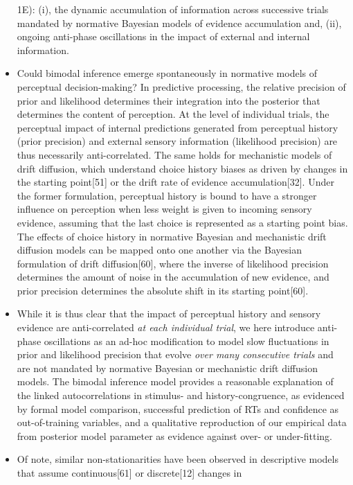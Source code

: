 \documentclass[
]{article}
\begin{document}
\begin{itemize}
  1E): (i), the dynamic accumulation of information across successive
  trials mandated by normative Bayesian models of evidence accumulation
  and, (ii), ongoing anti-phase oscillations in the impact of external
  and internal information.
\item
  Could bimodal inference emerge spontaneously in normative models of
  perceptual decision-making? In predictive processing, the relative
  precision of prior and likelihood determines their integration into
  the posterior that determines the content of perception. At the level
  of individual trials, the perceptual impact of internal predictions
  generated from perceptual history (prior precision) and external
  sensory information (likelihood precision) are thus necessarily
  anti-correlated. The same holds for mechanistic models of drift
  diffusion, which understand choice history biases as driven by changes
  in the starting point{[}51{]} or the drift rate of evidence
  accumulation{[}32{]}. Under the former formulation, perceptual history
  is bound to have a stronger influence on perception when less weight
  is given to incoming sensory evidence, assuming that the last choice
  is represented as a starting point bias. The effects of choice history
  in normative Bayesian and mechanistic drift diffusion models can be
  mapped onto one another via the Bayesian formulation of drift
  diffusion{[}60{]}, where the inverse of likelihood precision
  determines the amount of noise in the accumulation of new evidence,
  and prior precision determines the absolute shift in its starting
  point{[}60{]}.
\item
  While it is thus clear that the impact of perceptual history and
  sensory evidence are anti-correlated \emph{at each individual trial},
  we here introduce anti-phase oscillations as an ad-hoc modification to
  model slow fluctuations in prior and likelihood precision that evolve
  \emph{over many consecutive trials} and are not mandated by normative
  Bayesian or mechanistic drift diffusion models. The bimodal inference
  model provides a reasonable explanation of the linked autocorrelations
  in stimulus- and history-congruence, as evidenced by formal model
  comparison, successful prediction of RTs and confidence as
  out-of-training variables, and a qualitative reproduction of our
  empirical data from posterior model parameter as evidence against
  over- or under-fitting.
\item
  Of note, similar non-stationarities have been observed in descriptive
  models that assume continuous{[}61{]} or discrete{[}12{]} changes in

\end{itemize}
\end{document}
